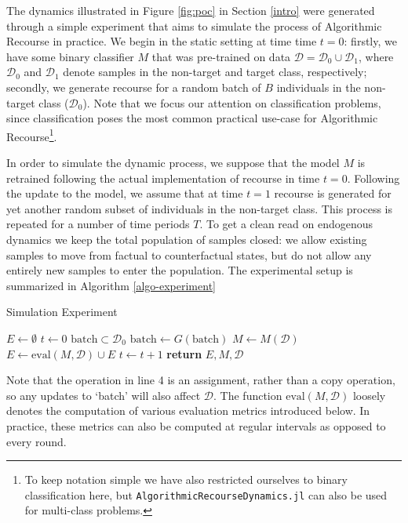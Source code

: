 \documentclass[conference,final,]{IEEEtran}
\theoremstyle{definition}
\theoremstyle{definition}
\theoremstyle{definition}
\theoremstyle{definition}
\theoremstyle{remark}
\begin{document}
The dynamics illustrated in Figure \ref{fig:poc} in Section \ref{intro} were generated through a simple experiment that aims to simulate the process of Algorithmic Recourse in practice. We begin in the static setting at time time \(t=0\): firstly, we have some binary classifier \(M\) that was pre-trained on data \(\mathcal{D}=\mathcal{D}_0 \cup \mathcal{D}_1\), where \(\mathcal{D}_0\) and \(\mathcal{D}_1\) denote samples in the non-target and target class, respectively; secondly, we generate recourse for a random batch of \(B\) individuals in the non-target class (\(\mathcal{D}_0\)). Note that we focus our attention on classification problems, since classification poses the most common practical use-case for Algorithmic Recourse\footnote{To keep notation simple we have also restricted ourselves to binary classification here, but \texttt{AlgorithmicRecourseDynamics.jl} can also be used for multi-class problems.}.

In order to simulate the dynamic process, we suppose that the model \(M\) is retrained following the actual implementation of recourse in time \(t=0\). Following the update to the model, we assume that at time \(t=1\) recourse is generated for yet another random subset of individuals in the non-target class. This process is repeated for a number of time periods \(T\). To get a clean read on endogenous dynamics we keep the total population of samples closed: we allow existing samples to move from factual to counterfactual states, but do not allow any entirely new samples to enter the population. The experimental setup is summarized in Algorithm \ref{algo-experiment}

\begin{algorithm}
\caption{Simulation Experiment}\label{algo-experiment}
\begin{algorithmic}[1]
\State $E\gets \emptyset$ 
\State $t\gets 0$
\State $\text{batch} \subset \mathcal{D}_0$ 
\State $\text{batch}\gets G(\text{batch})$ 
\State $M\gets M(\mathcal{D})$ 
\State $E\gets \text{eval}(M,\mathcal{D}) \cup E$ 
\State $t\gets t+1$ 
\EndWhile
\State \textbf{return} $E, M,\mathcal{D}$
\EndProcedure
\end{algorithmic}
\end{algorithm}

Note that the operation in line 4 is an assignment, rather than a copy operation, so any updates to `batch' will also affect \(\mathcal{D}\). The function \(\text{eval}(M,\mathcal{D})\) loosely denotes the computation of various evaluation metrics introduced below. In practice, these metrics can also be computed at regular intervals as opposed to every round.
\end{document}
